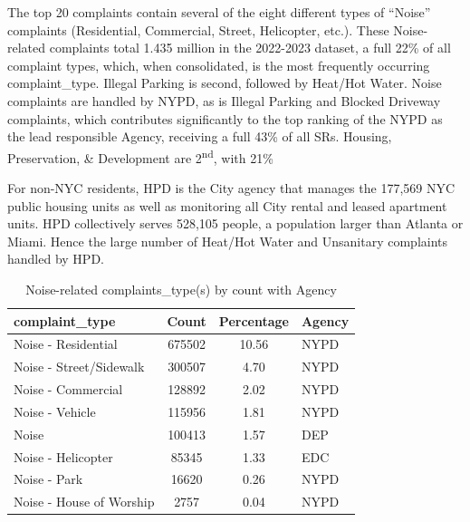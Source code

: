 \documentclass[12pt, titlepage]{article}
\begin{document}
The top 20 complaints contain several of the eight different types of ``Noise'' 
complaints (Residential, Commercial, Street, Helicopter, etc.). These Noise-related
complaints total 1.435 million in the 2022-2023 dataset, a full 22\% of 
all complaint types, which, when consolidated, is the most frequently occurring complaint\_type.
Illegal Parking is second, followed by Heat/Hot Water. Noise complaints 
are handled by NYPD, as is Illegal Parking and Blocked Driveway complaints, 
which contributes significantly to the top ranking of the NYPD as the lead 
responsible Agency, receiving a full 43\% of all SRs. 
Housing, Preservation, \& Development are 2\textsuperscript{nd}, with 21\%

For  non-NYC residents, HPD is the City agency that manages the 
177,569 NYC public housing units as well as monitoring
all City rental and leased apartment units. HPD collectively serves 
528,105 people, a population larger than Atlanta or Miami. 
Hence the large number of Heat/Hot Water and Unsanitary complaints 
handled by HPD. 

\begin{table}[tbp]
    \centering
    \caption{Noise-related complaints\_type(s) by count with Agency}
	    \begin{tabular}{@{}lS[table-format=7.0,round-mode=places,
	    round-precision=0]S[table-format=2.2,round-mode=places,
	    round-precision=2]l@{}} %
	        \toprule
	        \textbf{complaint\_type} & \textbf{Count} & \textbf{Percentage} & \textbf{Agency} \\ 
	        \midrule
	        Noise - Residential        & 675502 & 10.56 & NYPD  \\ 
	        Noise - Street/Sidewalk    & 300507 &  4.70 & NYPD  \\ 
	        Noise - Commercial         & 128892 &  2.02 & NYPD  \\ 
	        Noise - Vehicle            & 115956 &  1.81 & NYPD  \\ 
	        Noise                      & 100413 &  1.57 & DEP   \\ 
	        Noise - Helicopter         &  85345 &  1.33 & EDC   \\ 
	        Noise - Park               &  16620 &  0.26 & NYPD  \\ 
	        Noise - House of Worship &   2757 &  0.04 & NYPD  \\ 
	        \bottomrule
	    \end{tabular}
    \label{tab:noisecomplaints}
\end{table}
\end{document}
